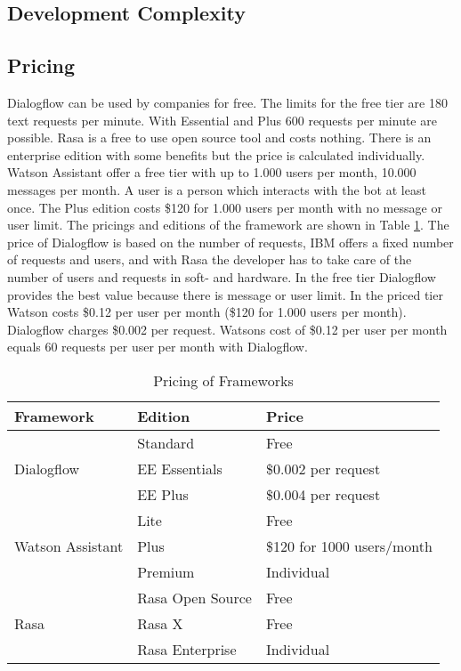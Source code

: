 \subsection*{Development Complexity}
\subsection*{Pricing} \label{sec:pricing}
Dialogflow can be used by companies for free.
The limits for the free tier are 180 text requests per minute.
With Essential and Plus 600 requests per minute are possible.
Rasa is a free to use open source tool and costs nothing.
There is an enterprise edition with some benefits but the price
is calculated individually.
Watson Assistant offer a free tier with up to 1.000 users per month, 
10.000 messages per month.
A user is a person which interacts with the bot at least once.
The Plus edition costs \$120 for 1.000 users per month with
no message or user limit.
The pricings and editions of the framework are shown in Table \ref{tab:pricing}.
The price of Dialogflow is based on the number of requests,
IBM offers a fixed number of requests and users, and with Rasa the developer has
to take care of the number of users and requests in soft- and hardware.
In the free tier Dialogflow provides the best value because there is message or user limit.
In the priced tier Watson costs \$0.12 per user per month (\$120 for 1.000 users per month).
Dialogflow charges \$0.002 per request.
Watsons cost of \$0.12 per user per month equals 60 requests per user per month with Dialogflow.


\begin{table}[H]
    \centering
    \begin{tabular}{ l | l | l }
        Framework & Edition & Price \\ \hline \hline
        \multirow{3}{*}{Dialogflow} & Standard & Free \\
        & EE Essentials &  \$0.002 per request\\
        & EE Plus & \$0.004 per request \\ \hline

        \multirow{3}{*}{Watson Assistant} & Lite & Free \\
        & Plus &  \$120 for 1000 users/month\\
        & Premium & Individual \\ \hline

        \multirow{3}{*}{Rasa} & Rasa Open Source & Free \\
        & Rasa X &  Free\\
        & Rasa Enterprise & Individual \\ \hline
    \end{tabular}
    \caption{Pricing of Frameworks \cite{rasa, dialogflow, watsonassistant}} \label{tab:pricing}
\end{table} \noindent



